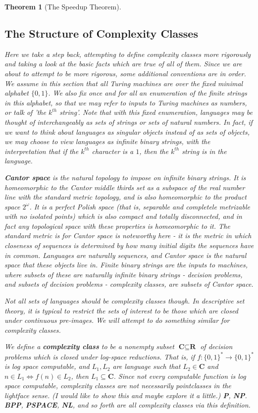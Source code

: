 \documentclass{article}
\theoremstyle{definition}
\theoremstyle{plain}
\theoremstyle{theorem}
\newtheorem{theorem}{Theorem}[section]
\begin{document}
\begin{theorem}[The Speedup Theorem]
\subsection{The Structure of Complexity Classes}
Here we take a step back, attempting to define complexity classes more rigorously and taking a look at the basic facts which are true of all of them. Since we are about to attempt to be more rigorous, some additional conventions are in order. We assume in this section that all Turing machines are over the fixed minimal alphabet $\{0,1\}$. We also fix once and for all an enumeration of the finite strings in this alphabet, so that we may refer to inputs to Turing machines as numbers, or talk of 'the $k^{th}$ string'. Note that with this fixed enumeration, languages may be thought of interchangeably as sets of strings or sets of natural numbers. In fact, if we want to think about languages as singular objects instead of as sets of objects, we may choose to view languages as infinite binary strings, with the interpretation that if the $k^{th}$ character is a $1$, then the $k^{th}$ string is in the language.
\par \textbf{Cantor space} is the natural topology to impose on infinite binary strings. It is homeomorphic to the Cantor middle thirds set as a subspace of the real number line with the standard metric topology, and is also homeomorphic to the product space $2^{\omega}$. It is a perfect Polish space (that is, separable and completele metrizable with no isolated points) which is also compact and totally disconnected, and in fact any topological space with these properties is homeomorphic to it. The standard metric is for Cantor space is noteworthy here - it is the metric in which closeness of sequences is determined by how many initial digits the sequences have in common. Languages are naturally sequences, and Cantor space is the natural space that these objects live in. Finite binary strings are the inputs to machines, where subsets of these are naturally infinite binary strings - decision problems, and subsets of decision problems - complexity classes, are subsets of Cantor space. 
\par Not all sets of languages should be complexity classes though. In descriptive set theory, it is typical to restrict the sets of interest to be those which are closed under continuous pre-images. We will attempt to do something similar for complexity classes.
 \par We define a \textbf{complexity class} to be a nonempty subset $\textbf{C} \subseteq \textbf{R}$ of decision problems which is closed under log-space reductions. That is, if $f:\{0,1\}^* \to \{0,1\}^*$ is log space computable, and $L_1,L_2$ are language such that $L_2 \in \textbf{C}$ and $n \in L_1 \iff f(n) \in L_2$, then $L_1 \subseteq \textbf{C}$. Since not every computable function is log space computable, complexity classes are not necessarily pointclasses in the lightface sense. (I would like to show this and maybe explore it a little.) \textbf{P}, \textbf{NP}. \textbf{BPP}, \textbf{PSPACE}, \textbf{NL}, and so forth are all complexity classes via this definition.

\end{theorem}
\end{document}
